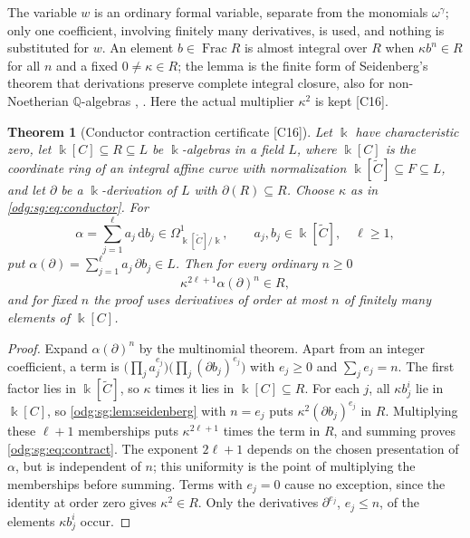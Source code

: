 \documentclass[11pt,oneside]{article}
\numberwithin{equation}{section}
\newtheorem{theorem}{Theorem}[section]
\theoremstyle{definition}
\theoremstyle{remark}
\newcommand{\Q}{\mathbb Q}
\newcommand{\Frac}{\operatorname{Frac}}
\newcommand{\src}[1]{\textup{\textsf{\small[#1]}}}
\newcommand{\dif}{\mathrm d}
\begin{document}
The variable $w$ is an ordinary formal variable, separate from the monomials
$\omega^\gamma$; only one coefficient, involving finitely many derivatives, is used, and
nothing is substituted for $w$. An element $b\in\Frac R$ is almost integral over $R$ when
$\kappa b^n\in R$ for all $n$ and a fixed $0\ne\kappa\in R$; the lemma is the finite form
of Seidenberg's theorem that derivations preserve complete integral closure, also for
non-Noetherian $\Q$-algebras \cite[Section 3]{Seidenberg}, \cite[Section 2.5]{Ciuperca}.
Here the actual multiplier $\kappa^2$ is kept \src{C16}.

\begin{theorem}[Conductor contraction certificate \src{C16}]\label{odg:sg:thm:conductor}
Let $\Bbbk$ have characteristic zero, let $\Bbbk[C]\subseteq R\subseteq L$ be
$\Bbbk$-algebras in a field $L$, where $\Bbbk[C]$ is the coordinate ring of an integral
affine curve with normalization $\Bbbk[\widetilde C]\subseteq F\subseteq L$, and let
$\partial$ be a $\Bbbk$-derivation of $L$ with $\partial(R)\subseteq R$. Choose $\kappa$ as
in \eqref{odg:sg:eq:conductor}. For
\[
 \alpha=\sum_{j=1}^{\ell}a_j\,\dif b_j\in\Omega^1_{\Bbbk[\widetilde C]/\Bbbk},
 \qquad a_j,b_j\in\Bbbk[\widetilde C],\quad \ell\ge1,
\]
put $\alpha(\partial)=\sum_{j=1}^{\ell}a_j\,\partial b_j\in L$. Then for every ordinary
$n\ge0$
\begin{equation}\label{odg:sg:eq:contract}
 \kappa^{2\ell+1}\alpha(\partial)^n\in R ,
\end{equation}
and for fixed $n$ the proof uses derivatives of order at most $n$ of finitely many
elements of $\Bbbk[C]$.
\end{theorem}
\begin{proof}
Expand $\alpha(\partial)^n$ by the multinomial theorem. Apart from an integer coefficient,
a term is $\bigl(\prod_ja_j^{e_j}\bigr)\bigl(\prod_j(\partial b_j)^{e_j}\bigr)$ with
$e_j\ge0$ and $\sum_je_j=n$. The first factor lies in $\Bbbk[\widetilde C]$, so $\kappa$
times it lies in $\Bbbk[C]\subseteq R$. For each $j$, all $\kappa b_j^i$ lie in $\Bbbk[C]$,
so \cref{odg:sg:lem:seidenberg} with $n=e_j$ puts $\kappa^2(\partial b_j)^{e_j}$ in $R$.
Multiplying these $\ell+1$ memberships puts $\kappa^{2\ell+1}$ times the term in $R$, and
summing proves \eqref{odg:sg:eq:contract}. The exponent $2\ell+1$
depends on the chosen presentation of $\alpha$, but is independent of $n$;
this uniformity is the point of multiplying the memberships before summing.
Terms with $e_j=0$ cause no exception, since the identity at order zero gives
$\kappa^2\in R$. Only the derivatives $\partial^{e_j}$,
$e_j\le n$, of the elements $\kappa b_j^i$ occur.
\end{proof}
\end{document}
